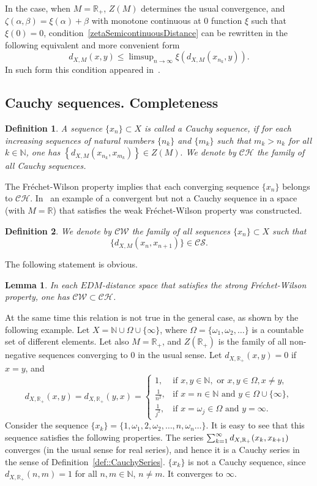 \documentclass[12pt]{amsart}          %
\newtheorem{lemma}{Lemma}
\newtheorem{definition}{Definition}
\newcommand{\RR}{\mathbb R}
\newcommand{\NN}{\mathbb N}
\begin{document}
In the case, when $M= \RR_+$, $Z(M)$ determines the usual convergence, and $\zeta(\alpha,\beta) = \xi(\alpha) + \beta$ with  monotone continuous at $0$ function $\xi$ such that $\xi(0) = 0$, condition~\eqref{zetaSemicontinuousDistance} can be rewritten in the following equivalent and more convenient form
$$
d_{X,M}(x,y) \leq \limsup\nolimits_{n\to\infty}\xi(d_{X,M}(x_{n_k},y)).
$$
In such form this condition appeared in~\cite{Jleli,Roldan,VillaMorales}.

\subsection{Cauchy sequences. Completeness}

\begin{definition}
A sequence $\{ x_n\}\subset X$ is called a Cauchy sequence, if for each increasing sequences of natural numbers $\{n_k\}$ and $\{m_k\}$ such that $m_k> n_k$ for all $k\in\NN$,  one has $\left\{d_{X,M}(x_{n_k},x_{m_k})\right\}\in Z(M).$ We denote by $\mathcal{CH}$ the family of all Cauchy sequences.
\end{definition}
The Fr\'{e}chet-Wilson property implies that each converging sequence $\{x_n\}$ belongs to $\mathcal{CH}$. In~\cite{Wilson} an example of a convergent but not a Cauchy sequence in a space (with $M = \RR$) that satisfies the weak Fr\'{e}chet-Wilson property  was constructed.
\begin{definition}
 We denote by $\mathcal{CW}$ the family of all sequences $\{x_n\}\subset X$ such that $$\{d_{X,M}(x_n,x_{n+1})\}\in \mathcal{CS}.$$
\end{definition}
The following statement is obvious.
\begin{lemma}\label{l::connection}
In each $EDM$-distance space that satisfies the strong Fr\'{e}chet-Wilson property, one has  $\mathcal{CW}\subset \mathcal{CH}$.
\end{lemma}
At the same time this relation is not true in the general case, as shown by the following example. 
Let $X=\NN\cup\Omega\cup \{\infty\}$, where $\Omega=\{ \omega_1,\omega_2,\ldots \}$ is a countable set of different elements. Let also $M=\RR_+$, {and $Z(\RR_+)$ is the family of all non-negative sequences converging to $0$ in the usual sense.} Let $d_{X,\RR_+}(x,y)=0$ if $x=y$, and 
$$d_{X,\RR_+}(x,y)=d_{X,\RR_+}(y,x)=
\begin{cases}
1, & \text{if } x,y\in\NN, \text{ or } x,y\in \Omega, x\neq y,\\
\frac 1{n^2}, & \text{if $x=n\in \NN$ and $y\in \Omega\cup\{\infty\}$},\\
 \frac 1{j^2}, &\text{if $x=\omega_j\in \Omega$ and $y=\infty$}.
\end{cases}
$$
Consider the sequence $\{x_k\}=\{ 1,\omega_1, 2,\omega_2,\ldots , n,\omega_n\ldots\}$. It is easy to see that this sequence satisfies the following properties. The series $
\sum\nolimits\nolimits_{k=1}^\infty d_{X,\RR_+}(x_k,x_{k+1})
$ converges (in the usual sense for real series), and hence it is a Cauchy series in the sense of Definition~\ref{def::CauchySeries}. $\{x_k\}$ is not a Cauchy sequence, since $d_{X,\RR_+}(n,m)=1$ for all  $n,m\in \NN$, $n\neq m$. It converges to $\infty$.
\end{document}
